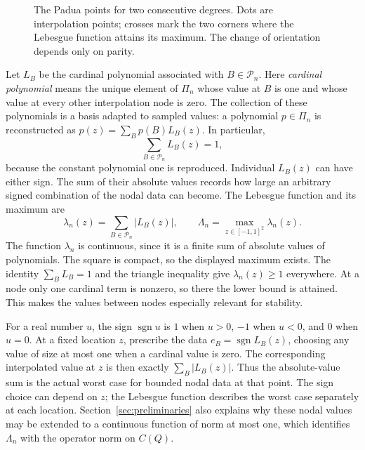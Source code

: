 \begin{figure}[t]
\centering
{}
\caption{The Padua points for two consecutive degrees. Dots are interpolation
points; crosses mark the two corners where the Lebesgue function attains
its maximum. The change of orientation depends only on parity.}
\label{fig:padua-nodes}
\end{figure}

Let $L_B$ be the cardinal polynomial associated with $B\in\mathcal P_n$.
Here \emph{cardinal polynomial} means the unique element of $\Pi_n$
whose value at $B$ is one and whose value at every other interpolation
node is zero. The collection of these polynomials is a basis adapted to
sampled values: a polynomial $p\in\Pi_n$ is reconstructed as
$p(z)=\sum_B p(B)L_B(z)$. In particular,
\[
 \sum_{B\in\mathcal P_n}L_B(z)=1,
\]
because the constant polynomial one is reproduced. Individual $L_B(z)$
can have either sign. The sum of their absolute values records how
large an arbitrary signed combination of the nodal data can become.
The Lebesgue function and its maximum are
\[
 \lambda_n(z)=\sum_{B\in\mathcal P_n}|L_B(z)|,
 \qquad \Lambda_n=\max_{z\in[-1,1]^2}\lambda_n(z).
\]
The function $\lambda_n$ is continuous, since it is a finite sum of
absolute values of polynomials. The square is compact, so the displayed
maximum exists. The identity $\sum_B L_B=1$ and the triangle inequality
give $\lambda_n(z)\geq1$ everywhere. At a node only one cardinal term
is nonzero, so there the lower bound is attained. This makes the values
between nodes especially relevant for stability.

For a real number $u$, the sign $\operatorname{sgn}u$ is $1$ when
$u>0$, $-1$ when $u<0$, and $0$ when $u=0$. At a fixed location
$z$, prescribe the data $e_B=\operatorname{sgn}L_B(z)$, choosing any
value of size at most one when a cardinal value is zero.
The corresponding interpolated value at $z$ is then exactly
$\sum_B|L_B(z)|$. Thus the absolute-value sum is the actual worst case
for bounded nodal data at that point. The sign choice can depend on $z$;
the Lebesgue function describes the worst case separately at each
location. Section~\ref{sec:preliminaries} also explains why these nodal
values may be extended to a continuous function of norm at most one,
which identifies $\Lambda_n$ with the operator norm on $C(Q)$.

